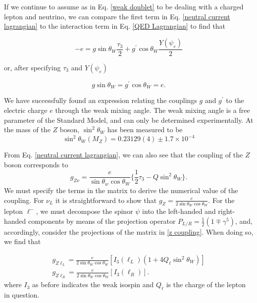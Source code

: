 \documentclass[10pt,a4paper]{book}
\begin{document}
If we continue to assume as in Eq. \ref{weak doublet} to be dealing with a charged lepton and neutrino, we can compare the first term in Eq. \ref{neutral current lagrangian} to the interaction term in Eq. \ref{QED Lagrangian} to find that 

\begin{equation}
-e = g\sin\theta_W \frac{\tau_3}{2} + g^\prime \cos\theta_W \frac{Y(\psi_{e})}{2}
\end{equation}

or, after specifying $\tau_3$ and $Y(\psi_e)$

\begin{equation}
g\sin\theta_W = g^\prime \cos\theta_W = e.
\end{equation}

We have successfully found an expression relating the couplings $g$ and $g^\prime$ to the electric charge $e$ through the weak mixing angle. The weak mixing angle is a free parameter of the Standard Model, and can only be determined experimentally. At the mass of the $Z$ boson, $\sin^2\theta_W$ has been measured to be \cite{ParticleDataGroup:2024cfk}
\begin{equation}
    \sin^2\theta_W(M_Z) = 0.231 29(4) \pm 1.7 \times 10^{-4}
\end{equation}

From Eq. \ref{neutral current lagrangian}, we can also see that the coupling of the $Z$ boson corresponds to 
\begin{equation}
g_{Z\nu} = \frac{e}{\sin\theta_w\cos\theta_W}\{\frac{1}{2}\tau_3 - Q\sin^2\theta_W\}.
\label{z coupling}
\end{equation}
We must specify the terms in the matrix to derive the numerical value of the coupling. For $\nu_L$ it is straightforward to show that $g_Z = \frac{e}{2\sin\theta_W\cos\theta_W}$. For the lepton $\ell^-$, we must decompose the spinor $\psi$ into the left-handed and right-handed components by means of the projection operator $P_{L/R} = \frac{1}{2}(1\mp\gamma^5)$, and, accordingly, consider the projections of the matrix in \ref{z coupling}. When doing so, we find that 

\begin{gather}
    g_{Z\ell_L} = \frac{e}{2\sin\theta_W\cos\theta_W}[I_3(\ell_L)(1 + 4Q_\ell\sin^2\theta_W)] \\
    g_{Z\ell_R} = \frac{e}{2\sin\theta_W\cos\theta_W}[I_3(\ell_R)].
\end{gather}
where $I_3$ as before indicates the weak isospin and $Q_\ell$ is the charge of the lepton in question.
\end{document}
